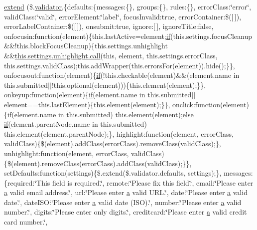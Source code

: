 \begin{DoxyCompactItemize}
\hyperlink{jquery_8validate-vsdoc_8js_a90e79f9be522c7080924ad4ceb3efefe}{extend} (\$.\hyperlink{_scripts_2jquery_8validate_8js_a2dc8272bb221cdffcccbd20db038f172}{validator},\{defaults\+:\{messages\+:\{\}, groups\+:\{\}, rules\+:\{\}, error\+Class\+:\char`\"{}error\char`\"{}, valid\+Class\+:\char`\"{}valid\char`\"{}, error\+Element\+:\char`\"{}label\char`\"{}, focus\+Invalid\+:true, error\+Container\+:\$(\mbox{[}$\,$\mbox{]}), error\+Label\+Container\+:\$(\mbox{[}$\,$\mbox{]}), onsubmit\+:true, ignore\+:\mbox{[}$\,$\mbox{]}, ignore\+Title\+:false, onfocusin\+:function(element)\{this.\+last\+Active=element;\hyperlink{_scripts_2respond_8min_8js_a93851d60dd037a83509a1757b9ee7b66}{if}(this.\+settings.\+focus\+Cleanup \&\&!this.\+block\+Focus\+Cleanup)\{this.\+settings.\+unhighlight \&\&\hyperlink{_scripts_2dropzone_8js_aafc46d047b4d7639fd2c4b927ec5048c}{this.\+settings.\+unhighlight.\+call}(this, element, this.\+settings.\+error\+Class, this.\+settings.\+valid\+Class);this.\+add\+Wrapper(this.\+errors\+For(element)).hide();\}\}, onfocusout\+:function(element)\{\hyperlink{_scripts_2respond_8min_8js_a93851d60dd037a83509a1757b9ee7b66}{if}(!this.\+checkable(element)\&\&(element.\+name in this.\+submitted$\vert$$\vert$!this.\+optional(element)))\{this.\+element(element);\}\}, onkeyup\+:function(element)\{\hyperlink{_scripts_2respond_8min_8js_a93851d60dd037a83509a1757b9ee7b66}{if}(element.\+name in this.\+submitted$\vert$$\vert$element==this.\+last\+Element)\{this.\+element(element);\}\}, onclick\+:function(element)\{\hyperlink{_scripts_2respond_8min_8js_a93851d60dd037a83509a1757b9ee7b66}{if}(element.\+name in this.\+submitted) this.\+element(element);\hyperlink{_scripts_2jquery_8validate_8js_a0544c3fe466e421738dae463968b70ba}{else} \hyperlink{_scripts_2respond_8min_8js_a93851d60dd037a83509a1757b9ee7b66}{if}(element.\+parent\+Node.\+name in this.\+submitted) this.\+element(element.\+parent\+Node);\}, highlight\+:function(element, error\+Class, valid\+Class)\{\$(element).add\+Class(error\+Class).remove\+Class(valid\+Class);\}, unhighlight\+:function(element, error\+Class, valid\+Class)\{\$(element).remove\+Class(error\+Class).add\+Class(valid\+Class);\}\}, set\+Defaults\+:function(settings)\{\$.extend(\$.validator.\+defaults, settings);\}, messages\+:\{required\+:\char`\"{}This field is required.\char`\"{}, remote\+:\char`\"{}Please fix this field.\char`\"{}, email\+:\char`\"{}Please enter \hyperlink{_scripts_2bootstrap_8min_8js_a7318f59fb86a4437995ee89c780c51ac}{a} valid email address.\char`\"{}, url\+:\char`\"{}Please enter \hyperlink{_scripts_2bootstrap_8min_8js_a7318f59fb86a4437995ee89c780c51ac}{a} valid U\+R\+L.\char`\"{}, date\+:\char`\"{}Please enter \hyperlink{_scripts_2bootstrap_8min_8js_a7318f59fb86a4437995ee89c780c51ac}{a} valid date.\char`\"{}, date\+I\+S\+O\+:\char`\"{}Please enter \hyperlink{_scripts_2bootstrap_8min_8js_a7318f59fb86a4437995ee89c780c51ac}{a} valid date (I\+S\+O).\char`\"{}, number\+:\char`\"{}Please enter \hyperlink{_scripts_2bootstrap_8min_8js_a7318f59fb86a4437995ee89c780c51ac}{a} valid number.\char`\"{}, digits\+:\char`\"{}Please enter only digits.\char`\"{}, creditcard\+:\char`\"{}Please enter \hyperlink{_scripts_2bootstrap_8min_8js_a7318f59fb86a4437995ee89c780c51ac}{a} valid credit card number.\char`\"{}, 
\end{DoxyCompactItemize}
